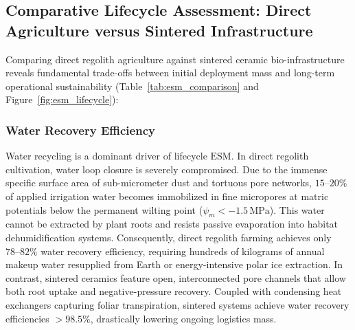 \subsection{Comparative Lifecycle Assessment: Direct Agriculture versus Sintered Infrastructure}
\label{subsec:comparative_lca}

Comparing direct regolith agriculture against sintered ceramic bio-infrastructure reveals fundamental trade-offs between initial deployment mass and long-term operational sustainability\cite{ming1989lunar,hanford2004advanced} (Table~\ref{tab:esm_comparison} and Figure~\ref{fig:esm_lifecycle}):

\subsubsection{Water Recovery Efficiency}
Water recycling is a dominant driver of lifecycle $\mathrm{ESM}$\cite{hanford2004advanced,ho2022towards}. In direct regolith cultivation, water loop closure is severely compromised\cite{ming1989lunar}. Due to the immense specific surface area of sub-micrometer dust and tortuous pore networks, $15\text{--}20\%$ of applied irrigation water becomes immobilized in fine micropores at matric potentials below the permanent wilting point ($\psi_m < -1.5\,\mathrm{MPa}$)\cite{paul2022plants,ming1989lunar,hendrix2024reactivity}. This water cannot be extracted by plant roots and resists passive evaporation into habitat dehumidification systems\cite{ming1989lunar,hendrix2024reactivity}. Consequently, direct regolith farming achieves only $78\text{--}82\%$ water recovery efficiency, requiring hundreds of kilograms of annual makeup water resupplied from Earth or energy-intensive polar ice extraction\cite{ming1989lunar,anderson2021lunar}. In contrast, sintered ceramics feature open, interconnected pore channels that allow both root uptake and negative-pressure recovery\cite{ming1989lunar}. Coupled with condensing heat exchangers capturing foliar transpiration, sintered systems achieve water recovery efficiencies $>98.5\%$, drastically lowering ongoing logistics mass\cite{ming1989lunar,wheeler2003carbon}.

